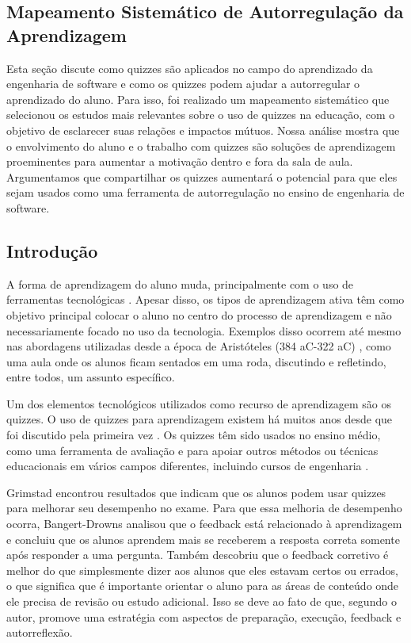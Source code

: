 \subsection{Mapeamento Sistemático de Autorregulação da Aprendizagem}

Esta seção discute como quizzes são aplicados no campo do aprendizado da engenharia de software e como os quizzes podem ajudar a autorregular o aprendizado do aluno. Para isso, foi realizado um mapeamento sistemático que selecionou os estudos mais relevantes sobre o uso de quizzes na educação, com o objetivo de esclarecer suas relações e impactos mútuos. Nossa análise mostra que o envolvimento do aluno e o trabalho com quizzes são soluções de aprendizagem proeminentes para aumentar a motivação dentro e fora da sala de aula. Argumentamos que compartilhar os quizzes aumentará o potencial para que eles sejam usados como uma ferramenta de autorregulação no ensino de engenharia de software. 

\subsection{Introdução}

A forma de aprendizagem do aluno muda, principalmente com o uso de ferramentas tecnológicas \cite{nilson_creating_2013, fink_creating_2013, ebert_school_2013}. Apesar disso, os tipos de aprendizagem ativa têm como objetivo principal colocar o aluno no centro do processo de aprendizagem e não necessariamente focado no uso da tecnologia. Exemplos disso ocorrem até mesmo nas abordagens utilizadas desde a época de Aristóteles (384 aC-322 aC) \cite{berge_computer_1995}, como uma aula onde os alunos ficam sentados em uma roda, discutindo e refletindo, entre todos, um assunto específico.

Um dos elementos tecnológicos utilizados como recurso de aprendizagem são os quizzes. O uso de quizzes para aprendizagem existem há muitos anos desde que foi discutido pela primeira vez \cite{mawhinney_comparison_1971}. Os quizzes têm sido usados no ensino médio, como uma ferramenta de avaliação e para apoiar outros métodos ou técnicas educacionais em vários campos diferentes, incluindo cursos de engenharia \cite{herold_student_2012, thevathayan_imparting_2017, figueiredo_evaluation_2014}. 

Grimstad \cite {grimstad_are_2004} encontrou resultados que indicam que os alunos podem usar quizzes para melhorar seu desempenho no exame. Para que essa melhoria de desempenho ocorra, Bangert-Drowns \cite {bangert-drowns_instructional_1991} analisou que o feedback está relacionado à aprendizagem e concluiu que os alunos aprendem mais se receberem a resposta correta somente após responder a uma pergunta. Também descobriu que o feedback corretivo é melhor do que simplesmente dizer aos alunos que eles estavam certos ou errados, o que significa que é importante orientar o aluno para as áreas de conteúdo onde ele precisa de revisão ou estudo adicional. Isso se deve ao fato de que, segundo o autor, promove uma estratégia com aspectos de preparação, execução, feedback e autorreflexão.

